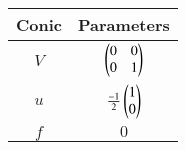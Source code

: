 \begin{tabular}[12pt]{ |c| c|}
    \hline
    \textbf{Conic}& \textbf{Parameters}\\ 
    \hline
     $V$& $\begin{pmatrix}0 & 0 \\ 0 & 1\end{pmatrix}$\\
    \hline 
     $u$& $\frac{-1}{2}\begin{pmatrix}1\\0\end{pmatrix}$\\
    \hline
     $f$& $0$\\
     \hline
    \end{tabular}